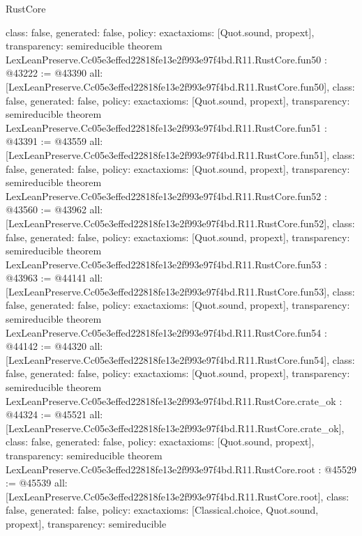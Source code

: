 \begin{lexlean}{RustCore}
\begin{coremodule}
{  class: false,
  generated: false,
  policy: exact{axioms: [Quot.sound, propext]},
  transparency: semireducible
}
theorem LexLeanPreserve.Cc05e3effed22818fe13e2f993e97f4bd.R11.RustCore.fun50 : @43222 := @43390 {
  all: [LexLeanPreserve.Cc05e3effed22818fe13e2f993e97f4bd.R11.RustCore.fun50],
  class: false,
  generated: false,
  policy: exact{axioms: [Quot.sound, propext]},
  transparency: semireducible
}
theorem LexLeanPreserve.Cc05e3effed22818fe13e2f993e97f4bd.R11.RustCore.fun51 : @43391 := @43559 {
  all: [LexLeanPreserve.Cc05e3effed22818fe13e2f993e97f4bd.R11.RustCore.fun51],
  class: false,
  generated: false,
  policy: exact{axioms: [Quot.sound, propext]},
  transparency: semireducible
}
theorem LexLeanPreserve.Cc05e3effed22818fe13e2f993e97f4bd.R11.RustCore.fun52 : @43560 := @43962 {
  all: [LexLeanPreserve.Cc05e3effed22818fe13e2f993e97f4bd.R11.RustCore.fun52],
  class: false,
  generated: false,
  policy: exact{axioms: [Quot.sound, propext]},
  transparency: semireducible
}
theorem LexLeanPreserve.Cc05e3effed22818fe13e2f993e97f4bd.R11.RustCore.fun53 : @43963 := @44141 {
  all: [LexLeanPreserve.Cc05e3effed22818fe13e2f993e97f4bd.R11.RustCore.fun53],
  class: false,
  generated: false,
  policy: exact{axioms: [Quot.sound, propext]},
  transparency: semireducible
}
theorem LexLeanPreserve.Cc05e3effed22818fe13e2f993e97f4bd.R11.RustCore.fun54 : @44142 := @44320 {
  all: [LexLeanPreserve.Cc05e3effed22818fe13e2f993e97f4bd.R11.RustCore.fun54],
  class: false,
  generated: false,
  policy: exact{axioms: [Quot.sound, propext]},
  transparency: semireducible
}
theorem LexLeanPreserve.Cc05e3effed22818fe13e2f993e97f4bd.R11.RustCore.crate_ok : @44324 := @45521 {
  all: [LexLeanPreserve.Cc05e3effed22818fe13e2f993e97f4bd.R11.RustCore.crate_ok],
  class: false,
  generated: false,
  policy: exact{axioms: [Quot.sound, propext]},
  transparency: semireducible
}
theorem LexLeanPreserve.Cc05e3effed22818fe13e2f993e97f4bd.R11.RustCore.root : @45529 := @45539 {
  all: [LexLeanPreserve.Cc05e3effed22818fe13e2f993e97f4bd.R11.RustCore.root],
  class: false,
  generated: false,
  policy: exact{axioms: [Classical.choice, Quot.sound, propext]},
  transparency: semireducible
}


\end{coremodule}
\end{lexlean}
